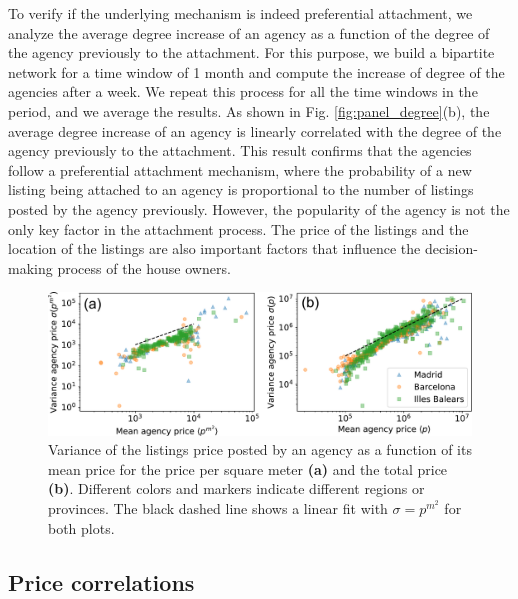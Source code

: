 To verify if the underlying mechanism is indeed preferential attachment, we analyze the average degree increase of an agency as a function of the degree of the agency previously to the attachment. For this purpose, we build a bipartite network for a time window of 1 month and compute the increase of degree of the agencies after a week. We repeat this process for all the time windows in the period, and we average the results. As shown in Fig. \ref{fig:panel_degree}(b), the average degree increase of an agency is linearly correlated with the degree of the agency previously to the attachment. This result confirms that the agencies follow a preferential attachment mechanism, where the probability of a new listing being attached to an agency is proportional to the number of listings posted by the agency previously. However, the popularity of the agency is not the only key factor in the attachment process. The price of the listings and the location of the listings are also important factors that influence the decision-making process of the house owners.

\begin{figure}
    \centering
    \includegraphics[width =\textwidth]{Figs/Idealista_dynamics/labeled_sigma_price.pdf}
	\caption[Variance of the agency price vs mean agency price.]{Variance of the listings price posted by an agency as a function of its mean price for the price per square meter \textbf{(a)} and the total price \textbf{(b)}. Different colors and markers indicate different regions or provinces. The black dashed line shows a linear fit with $\sigma = p^{{m}^2}$ for both plots. \label{fig:sigma_price}}
\end{figure}

\subsection{Price correlations}

